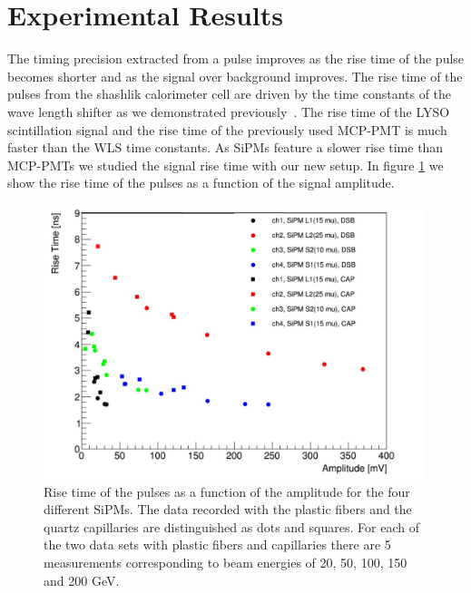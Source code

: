 \section{Experimental Results}
The timing precision extracted from a pulse improves as the rise time of the pulse becomes shorter and as the signal over background 
improves. The rise time of the pulses from the shashlik calorimeter cell are driven by the time constants of the wave length shifter
as we demonstrated previously~\cite{lysotiming}. The rise time of the LYSO scintillation signal and the rise time of the previously 
used MCP-PMT is much faster than the WLS time constants. As SiPMs feature a slower rise time than MCP-PMTs we studied the signal 
rise time with our new setup. In figure \ref{RiseTime} we show the rise time of the pulses as a function of the signal amplitude. 
%
\begin{figure}[htb]
\includegraphics[width=0.99\textwidth]{RiseTime.pdf}
\caption{\label{RiseTime}Rise time of the pulses as a function of the amplitude for the four different SiPMs.
 The data recorded with the plastic fibers and the quartz capillaries are distinguished as dots and squares. For each of the two data 
sets with plastic fibers and capillaries there are 5 measurements corresponding to beam energies of 20, 50, 100, 150 and 200 GeV.}
\end{figure}
